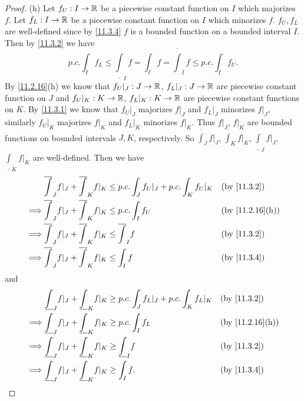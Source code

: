 \begin{proof}{(h)}
  Let \(f_U : I \to \mathbb{R}\) be a piecewise constant function on \(I\) which majorizes \(f\).
  Let \(f_L : I \to \mathbb{R}\) be a piecewise constant function on \(I\) which minorizes \(f\).
  \(f_U, f_L\) are well-defined since by \cref{11.3.4} \(f\) is a bounded function on a bounded interval \(I\).
  Then by \cref{11.3.2} we have
  \[
    p.c. \int_I f_L \leq \underline{\int}_I f = \int_I f = \overline{\int}_I f \leq p.c. \int_I f_U.
  \]
  By \cref{11.2.16}(h) we know that \(f_U|_J : J \to \mathbb{R}\), \(f_L|_J : J \to \mathbb{R}\) are piecewise constant function on \(J\) and \(f_U|_K : K \to \mathbb{R}\), \(f_L|_K : K \to \mathbb{R}\) are piecewise constant functions on \(K\).
  By \cref{11.3.1} we know that \(f_U|_J\) majorizes \(f|_J\) and \(f_L|_J\) minorizes \(f|_J\), similarly \(f_U|_K\) majorizes \(f|_K\) and \(f_L|_K\) minorizes \(f|_K\).
  Thus \(f|_J\), \(f|_K\) are bounded functions on bounded intervals \(J, K\), respectively.
  So \(\overline{\int}_J f|_J\), \(\overline{\int}_K f|_K\), \(\underline{\int}_J f|_J\), \(\underline{\int}_K f|_K\) are well-defined.
  Then we have
  \begin{align*}
             & \overline{\int}_J f|_J + \overline{\int}_K f|_K \leq p.c. \int_J f_U|_J + p.c. \int_K f_U|_K &  & \by{11.3.2}     \\
    \implies & \overline{\int}_J f|_J + \overline{\int}_K f|_K \leq p.c. \int_I f_U                         &  & \by{11.2.16}[h] \\
    \implies & \overline{\int}_J f|_J + \overline{\int}_K f|_K \leq \overline{\int}_I f                     &  & \by{11.3.2}     \\
    \implies & \overline{\int}_J f|_J + \overline{\int}_K f|_K \leq \int_I f                                &  & \by{11.3.4}
  \end{align*}
  and
  \begin{align*}
             & \underline{\int}_J f|_J + \underline{\int}_K f|_K \geq p.c. \int_J f_L|_J + p.c. \int_K f_L|_K &  & \by{11.3.2}     \\
    \implies & \underline{\int}_J f|_J + \underline{\int}_K f|_K \geq p.c. \int_I f_L                         &  & \by{11.2.16}[h] \\
    \implies & \underline{\int}_J f|_J + \underline{\int}_K f|_K \geq \underline{\int}_I f                    &  & \by{11.3.2}     \\
    \implies & \underline{\int}_J f|_J + \underline{\int}_K f|_K \geq \int_I f.                               &  & \by{11.3.4}
  \end{align*}

\end{proof}
